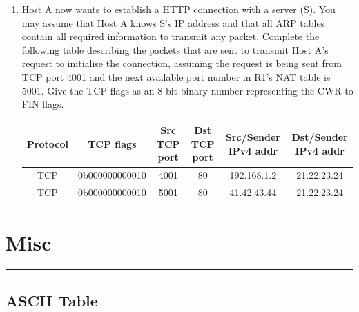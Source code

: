 \documentclass{article}
\begin{document}
\begin{enumerate}
    \item Host A now wants to establish a HTTP connection with a server (S). You may assume that Host A knows S's IP address and that all ARP tables contain all required information to transmit any packet. Complete the following table describing the packets that are sent to transmit Host A's request to initialise the connection, assuming the request is being sent from TCP port 4001 and the next available port number in R1's NAT table is 5001. Give the TCP flags as an 8-bit binary number representing the CWR to FIN flags.
    \begin{center}
    \begin{longtable}{| c | c | c | c | c | c |} 
    \hline
    Protocol & TCP flags & Src TCP port & Dst TCP port & Src/Sender IPv4 addr & Dst/Sender IPv4 addr \\
    \hline
    TCP & 0b000000000010 & 4001 & 80 & 192.168.1.2 & 21.22.23.24 \\
    \hline
    TCP & 0b000000000010 & 5001 & 80 & 41.42.43.44 & 21.22.23.24 \\
    \hline
    \end{longtable}
    \end{center}
\end{enumerate}

\newpage

\section*{Misc}
\noindent
\rule{\linewidth}{0.5mm}
\noindent

\subsection*{ASCII Table}
\end{document}
